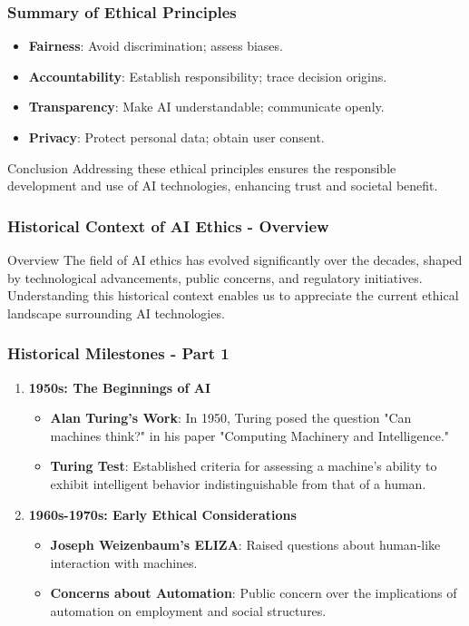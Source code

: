 \documentclass{beamer}
\begin{document}
\begin{frame}[fragile]
    \frametitle{Summary of Ethical Principles}
    \begin{itemize}
        \item \textbf{Fairness}: Avoid discrimination; assess biases.
        \item \textbf{Accountability}: Establish responsibility; trace decision origins.
        \item \textbf{Transparency}: Make AI understandable; communicate openly.
        \item \textbf{Privacy}: Protect personal data; obtain user consent.
    \end{itemize}
    \begin{block}{Conclusion}
        Addressing these ethical principles ensures the responsible development and use of AI technologies, enhancing trust and societal benefit.
    \end{block}
\end{frame}

\begin{frame}[fragile]
    \frametitle{Historical Context of AI Ethics - Overview}
    \begin{block}{Overview}
        The field of AI ethics has evolved significantly over the decades, shaped by technological advancements, public concerns, and regulatory initiatives. 
        Understanding this historical context enables us to appreciate the current ethical landscape surrounding AI technologies.
    \end{block}
\end{frame}

\begin{frame}[fragile]
    \frametitle{Historical Milestones - Part 1}
    \begin{enumerate}
        \item \textbf{1950s: The Beginnings of AI}
        \begin{itemize}
            \item \textbf{Alan Turing's Work}: In 1950, Turing posed the question "Can machines think?" in his paper "Computing Machinery and Intelligence."
            \item \textbf{Turing Test}: Established criteria for assessing a machine's ability to exhibit intelligent behavior indistinguishable from that of a human.
        \end{itemize}
        
        \item \textbf{1960s-1970s: Early Ethical Considerations}
        \begin{itemize}
            \item \textbf{Joseph Weizenbaum's ELIZA}: Raised questions about human-like interaction with machines.
            \item \textbf{Concerns about Automation}: Public concern over the implications of automation on employment and social structures.
        \end{itemize}
    \end{enumerate}
\end{frame}
\end{document}
